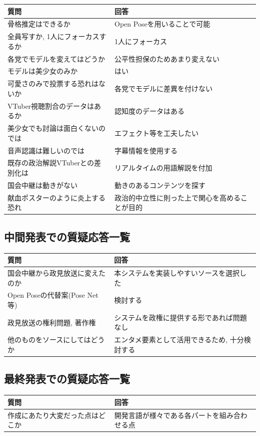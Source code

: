 \documentclass[a4paper,12pt]{jsarticle}
\begin{document}
\begin{table}[H]
	\begin{tabular}{|l|l|} \hline
		{\bf 質問} & {\bf 回答} \\ \hline \hline
		骨格推定はできるか & Open Poseを用いることで可能 \\ \hline
		全員写すか, 1人にフォーカスするか & 1人にフォーカス\\ \hline
		各党でモデルを変えてはどうか & 公平性担保のためあまり変えない\\ \hline
		モデルは美少女のみか & はい\\ \hline
		可愛さのみで投票する恐れはないか & 各党でモデルに差異を付けない\\ \hline
		VTuber視聴割合のデータはあるか & 認知度のデータはある\\ \hline
		美少女でも討論は面白くないのでは & エフェクト等を工夫したい\\ \hline
		音声認識は難しいのでは & 字幕情報を使用する\\ \hline
		既存の政治解説VTuberとの差別化は & リアルタイムの用語解説を付加\\ \hline
		国会中継は動きがない & 動きのあるコンテンツを探す\\ \hline
		献血ポスターのように炎上する恐れ & 政治的中立性に則った上で関心を高めることが目的\\ \hline
	\end{tabular}
\end{table}

\subsection{中間発表での質疑応答一覧}

\begin{table}[H]
	\begin{tabular}{|l|l|} \hline
		{\bf 質問} & {\bf 回答} \\ \hline \hline
		国会中継から政見放送に変えたのか & 本システムを実装しやすいソースを選択した\\ \hline
		Open Poseの代替案(Pose Net等) & 検討する\\ \hline
		政見放送の権利問題, 著作権 & システムを政権に提供する形であれば問題なし\\ \hline
		他のものをソースにしてはどうか & エンタメ要素として活用できるため, 十分検討する\\ \hline
	\end{tabular}
\end{table}

\subsection{最終発表での質疑応答一覧}

\begin{table}[H]
	\begin{tabular}{|l|l|} \hline
		{\bf 質問} & {\bf 回答} \\ \hline \hline
		作成にあたり大変だった点はどこか & 開発言語が様々である各パートを組み合わせる点\\ \hline
	\end{tabular}
\end{table}
\end{document}
